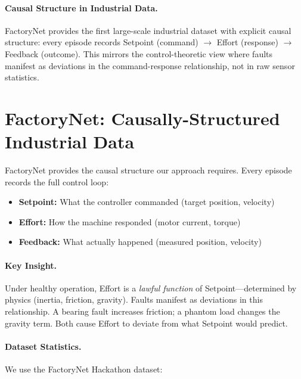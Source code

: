 \documentclass{article}
\begin{document}
\paragraph{Causal Structure in Industrial Data.} FactoryNet \cite{factorynet} provides the first large-scale industrial dataset with explicit causal structure: every episode records Setpoint (command) $\rightarrow$ Effort (response) $\rightarrow$ Feedback (outcome). This mirrors the control-theoretic view where faults manifest as deviations in the command-response relationship, not in raw sensor statistics.

\section{FactoryNet: Causally-Structured Industrial Data}

FactoryNet \cite{factorynet} provides the causal structure our approach requires. Every episode records the full control loop:

\begin{tcolorbox}[colback=blue!5,colframe=blue!40!black,title=FactoryNet Causal Schema]
\begin{itemize}
    \item \textbf{Setpoint:} What the controller commanded (target position, velocity)
    \item \textbf{Effort:} How the machine responded (motor current, torque)
    \item \textbf{Feedback:} What actually happened (measured position, velocity)
\end{itemize}
\end{tcolorbox}

\paragraph{Key Insight.} Under healthy operation, Effort is a \emph{lawful function} of Setpoint—determined by physics (inertia, friction, gravity). Faults manifest as deviations in this relationship. A bearing fault increases friction; a phantom load changes the gravity term. Both cause Effort to deviate from what Setpoint would predict.

\paragraph{Dataset Statistics.} We use the FactoryNet Hackathon dataset:
\end{document}
